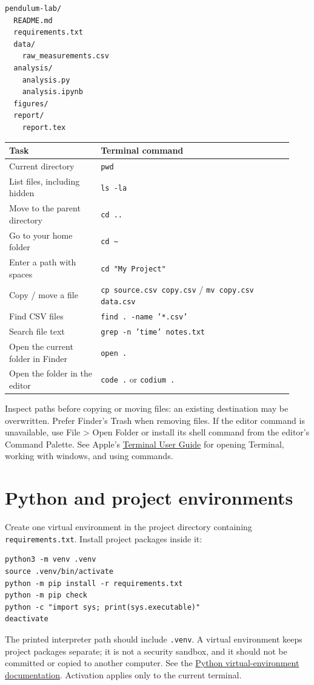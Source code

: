 \documentclass[11pt]{article}
\begin{document}
\begin{lstlisting}
pendulum-lab/
  README.md
  requirements.txt
  data/
    raw_measurements.csv
  analysis/
    analysis.py
    analysis.ipynb
  figures/
  report/
    report.tex
\end{lstlisting}

\begin{longtable}{p{0.30\linewidth}p{0.63\linewidth}}
\toprule Task & Terminal command\\ \midrule
Current directory & \texttt{pwd}\\
List files, including hidden & \texttt{ls -la}\\
Move to the parent directory & \texttt{cd ..}\\
Go to your home folder & \texttt{cd \textasciitilde}\\
Enter a path with spaces & \texttt{cd "My Project"}\\
Copy / move a file & \texttt{cp source.csv copy.csv} / \texttt{mv copy.csv data.csv}\\
Find CSV files & \texttt{find . -name '*.csv'}\\
Search file text & \texttt{grep -n 'time' notes.txt}\\
Open the current folder in Finder & \texttt{open .}\\
Open the folder in the editor & \texttt{code .} or \texttt{codium .}\\
\bottomrule
\end{longtable}
Inspect paths before copying or moving files: an existing destination may be
overwritten. Prefer Finder's Trash when removing files. If the editor command
is unavailable, use File > Open Folder or install its shell command from the
editor's Command Palette.
See Apple's
\href{https://support.apple.com/guide/terminal/welcome/mac}{Terminal User
Guide} for opening Terminal, working with windows, and using commands.

\section{Python and project environments}
Create one virtual environment in the project directory containing
\texttt{requirements.txt}. Install project packages inside it:
\begin{lstlisting}
python3 -m venv .venv
source .venv/bin/activate
python -m pip install -r requirements.txt
python -m pip check
python -c "import sys; print(sys.executable)"
deactivate
\end{lstlisting}
The printed interpreter path should include \texttt{.venv}. A virtual
environment keeps project packages separate; it is not a security sandbox,
and it should not be committed or copied to another computer. See the
\href{https://docs.python.org/3/library/venv.html}{Python virtual-environment
documentation}. Activation applies only to the current terminal.
\end{document}

